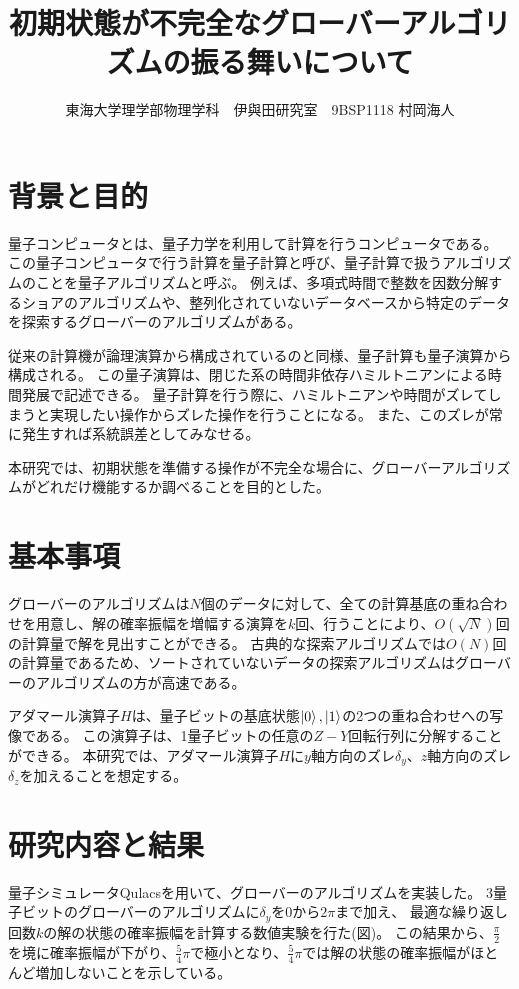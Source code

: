 \documentclass[platex,dvipdfmx, twocolumn]{jsarticle}			%
\title{初期状態が不完全なグローバーアルゴリズムの振る舞いについて}
\author{東海大学理学部物理学科　伊與田研究室　9BSP1118 村岡海人}
\date{}
\begin{document}
\maketitle
\section{背景と目的}
量子コンピュータとは、量子力学を利用して計算を行うコンピュータである。
この量子コンピュータで行う計算を量子計算と呼び、量子計算で扱うアルゴリズムのことを量子アルゴリズムと呼ぶ。
例えば、多項式時間で整数を因数分解するショアのアルゴリズムや、整列化されていないデータベースから特定のデータを探索するグローバーのアルゴリズムがある。

従来の計算機が論理演算から構成されているのと同様、量子計算も量子演算から構成される。
この量子演算は、閉じた系の時間非依存ハミルトニアンによる時間発展で記述できる。
量子計算を行う際に、ハミルトニアンや時間がズレてしまうと実現したい操作からズレた操作を行うことになる。
また、このズレが常に発生すれば系統誤差としてみなせる。

本研究では、初期状態を準備する操作が不完全な場合に、グローバーアルゴリズムがどれだけ機能するか調べることを目的とした。

\section{基本事項}
グローバーのアルゴリズムは$N個$のデータに対して、全ての計算基底の重ね合わせを用意し、解の確率振幅を増幅する演算を$k$回、行うことにより、$O(\sqrt{N})$回の計算量で解を見出すことができる。
古典的な探索アルゴリズムでは$O(N)$回の計算量であるため、ソートされていないデータの探索アルゴリズムはグローバーのアルゴリズムの方が高速である\cite{QuantumDojo}。

アダマール演算子$H$は、量子ビットの基底状態$\ket{0},\ket{1}$の2つの重ね合わせへの写像である。
この演算子は、1量子ビットの任意の$Z-Y$回転行列に分解することができる。
本研究では、アダマール演算子$H$に$y$軸方向のズレ$\delta_y$、$z$軸方向のズレ$\delta_z$を加えることを想定する\cite{BasicQuantumComputer}。


\section{研究内容と結果}
量子シミュレータQulacsを用いて、グローバーのアルゴリズムを実装した。
3量子ビットのグローバーのアルゴリズムに$\delta_y$を$0$から$2\pi$まで加え、
最適な繰り返し回数$k$の解の状態の確率振幅を計算する数値実験を行た(図)。
この結果から、$\frac{\pi}{2}$を境に確率振幅が下がり、$\frac{5}{4}\pi$で極小となり、$\frac{5}{4}\pi$では解の状態の確率振幅がほとんど増加しないことを示している。
\end{document}
